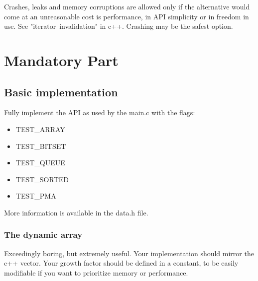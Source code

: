 \documentclass{42-en}
\begin{document}
    Crashes, leaks and memory corruptions are allowed only if the alternative would come at
    an unreasonable cost is performance, in API simplicity or in freedom in use. See "iterator~invalidation"
    in c++. Crashing may be the safest option.\\
    


\chapter{Mandatory Part}

    \section{Basic implementation}
        Fully implement the API as used by the main.c with the flags:\\

        \begin{itemize}\itemsep7pt
            \item TEST\_ARRAY
            \item TEST\_BITSET
            \item TEST\_QUEUE
            \item TEST\_SORTED
            \item TEST\_PMA
        \end{itemize}

        More information is available in the data.h file.

        \subsection{The dynamic array}
        Exceedingly boring, but extremely useful.
        Your implementation should mirror the c++ vector. Your growth factor should
        be defined in a constant, to be easily modifiable if you want to prioritize
        memory or performance.
\end{document}
